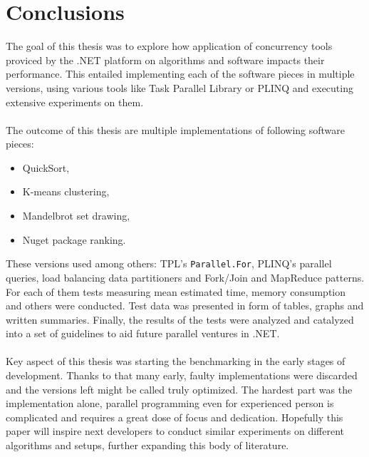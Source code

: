 \chapter{Conclusions}
The goal of this thesis was to explore how application of concurrency tools proviced by the .NET platform
on algorithms and software impacts their performance. This entailed implementing each of the software pieces
in multiple versions, using various tools like Task Parallel Library or PLINQ and executing extensive experiments on them.
\\ \\ 
The outcome of this thesis are multiple implementations of following software pieces: 
\begin{itemize}
	\item QuickSort,
	\item K-means clustering,
	\item Mandelbrot set drawing,
	\item Nuget package ranking.
\end{itemize}

These versions used among others: TPL's \texttt{Parallel.For}, PLINQ's parallel queries, load balancing data partitioners and Fork/Join and MapReduce patterns.
For each of them tests measuring mean estimated time, memory consumption and others were conducted. 
Test data was presented in form of tables, graphs and written summaries. 
Finally, the results of the tests were analyzed and catalyzed into a set of guidelines to aid future parallel ventures in .NET. 
\\ \\ 
Key aspect of this thesis was starting the benchmarking in the early stages of development. Thanks to that many early, faulty implementations were discarded and the versions left might be called truly optimized. The hardest part was the implementation alone, parallel programming even for experienced person is complicated and requires a great dose of focus and dedication. Hopefully this paper will inspire next developers to conduct similar experiments on different algorithms and setups, further expanding this body of literature. 